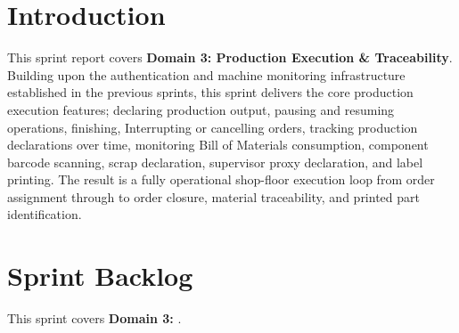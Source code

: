 \section*{Introduction}

This sprint report covers \textbf{Domain 3: Production Execution \& Traceability}.
Building upon the authentication and machine monitoring infrastructure established
in the previous sprints, this sprint delivers the core production execution
features; declaring production output, pausing and resuming operations, finishing, Interrupting 
or cancelling orders, tracking production declarations over time, monitoring Bill of
Materials consumption, component barcode scanning, scrap declaration, supervisor
proxy declaration, and label printing. The result is a fully operational shop-floor
execution loop from order assignment through to order closure, material traceability,
and printed part identification.

\section{Sprint Backlog}

This sprint covers \textbf{Domain 3:} \textbf{}.

